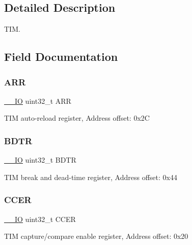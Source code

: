 \subsection{Detailed Description}
T\+IM. 

\subsection{Field Documentation}
\mbox{\label{struct_t_i_m___type_def_af17f19bb4aeea3cc14fa73dfa7772cb8}} 
\subsubsection{\texorpdfstring{A\+RR}{ARR}}
{\footnotesize\ttfamily \mbox{\hyperlink{core__sc300_8h_aec43007d9998a0a0e01faede4133d6be}{\+\_\+\+\_\+\+IO}} uint32\+\_\+t A\+RR}

T\+IM auto-\/reload register, Address offset\+: 0x2C \mbox{\label{struct_t_i_m___type_def_a476bae602205d6a49c7e71e2bda28c0a}} 
\subsubsection{\texorpdfstring{B\+D\+TR}{BDTR}}
{\footnotesize\ttfamily \mbox{\hyperlink{core__sc300_8h_aec43007d9998a0a0e01faede4133d6be}{\+\_\+\+\_\+\+IO}} uint32\+\_\+t B\+D\+TR}

T\+IM break and dead-\/time register, Address offset\+: 0x44 \mbox{\label{struct_t_i_m___type_def_a098110becfef10e1fd1b6a4f874da496}} 
\subsubsection{\texorpdfstring{C\+C\+ER}{CCER}}
{\footnotesize\ttfamily \mbox{\hyperlink{core__sc300_8h_aec43007d9998a0a0e01faede4133d6be}{\+\_\+\+\_\+\+IO}} uint32\+\_\+t C\+C\+ER}

T\+IM capture/compare enable register, Address offset\+: 0x20 \mbox{\label{struct_t_i_m___type_def_adb72f64492a75e780dd2294075c70fed}} 
